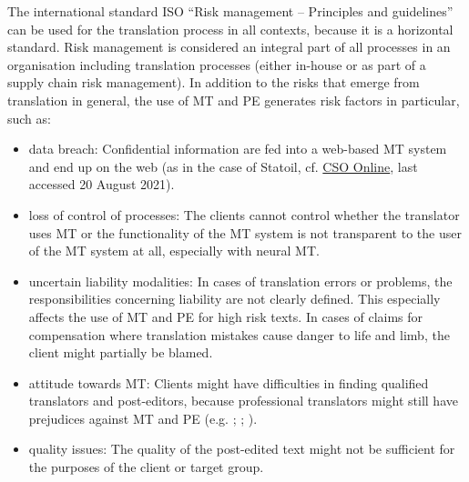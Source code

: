 The international standard ISO \citet{iso2009international} “Risk management – Principles and guidelines” can be used for the translation process in all contexts, because it is a horizontal standard. Risk management is considered an integral part of all processes in an organisation including translation processes (either in-house or as part of a supply chain risk management). In addition to the risks that emerge from translation in general, the use of MT and PE generates risk factors in particular, such as:

\begin{itemize}
    \item data breach: Confidential information are fed into a web-based MT system and end up on the web (as in the case of Statoil, cf. \href{https://www.csoonline.com/article/3236348/data-breached-in-translation.html}{CSO Online}, last accessed 20 August 2021).
    \item loss of control of processes: The clients cannot control whether the translator uses MT or the functionality of the MT system is not transparent to the user of the MT system at all, especially with neural MT.
    \item uncertain liability modalities: In cases of translation errors or problems, the responsibilities concerning liability are not clearly defined. This especially affects the use of MT and PE for high risk texts. In cases of claims for compensation where translation mistakes cause danger to life and limb, the client might partially be blamed.
    \item attitude towards MT: Clients might have difficulties in finding qualified translators and post-editors, because professional translators might still have prejudices against MT and PE (e.g. \citealt{cadwell2018resistance} ; \citealt{guerberof2013professional}; \citealt{laubli2017google}).
    \item quality issues: The quality of the post-edited text might not be sufficient for the purposes of the client or target group.
\end{itemize}
	
